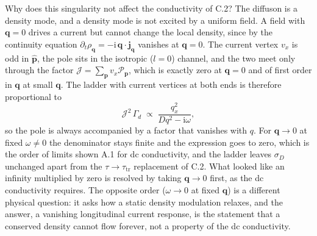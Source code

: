 Why does this singularity not affect the conductivity of C.2? The
diffuson is a density mode, and a density mode is not excited by a
uniform field. A field with $\mathbf q=0$ drives a current but cannot
change the local density, since by the continuity equation
$\partial_t\rho_{\mathbf q}=-\mathrm{i}\,\mathbf q\!\cdot\!\mathbf j_{\mathbf q}$
vanishes at $\mathbf q=0$. The current vertex $v_x$ is odd in $\hat{\mathbf p}$, the pole
sits in the isotropic ($l=0$) channel, and the two meet only through
the factor $\mathcal J=\sum_{\mathbf p}v_x\mathcal P_{\mathbf p}$, which
is exactly zero at $\mathbf q=0$ and of first order in $\mathbf q$ at
small $\mathbf q$. The ladder with current vertices at both ends is
therefore proportional to
\[
\mathcal J^2\,\Gamma_d\;\propto\;\frac{q_x^2}{Dq^2-\mathrm{i}\omega},
\]
so the pole is always accompanied by a factor that vanishes with $q$. For
$\mathbf q\to0$ at fixed $\omega\neq0$ the denominator stays finite and the expression goes to zero, which is the order of limits shown A.1 for dc conductivity, and
the ladder leaves $\sigma_D$ unchanged apart from the
$\tau\to\tau_{\mathrm{tr}}$ replacement of C.2. What looked like an infinity multiplied by zero is
resolved by taking $\mathbf q\to0$ first, as the dc conductivity requires.
The opposite order ($\omega\to0$ at fixed $\mathbf q$) is a different
physical question: it asks how a static density modulation relaxes, and the answer, a
vanishing longitudinal current response, is the statement that a conserved density cannot
flow forever, not a property of the dc conductivity.


